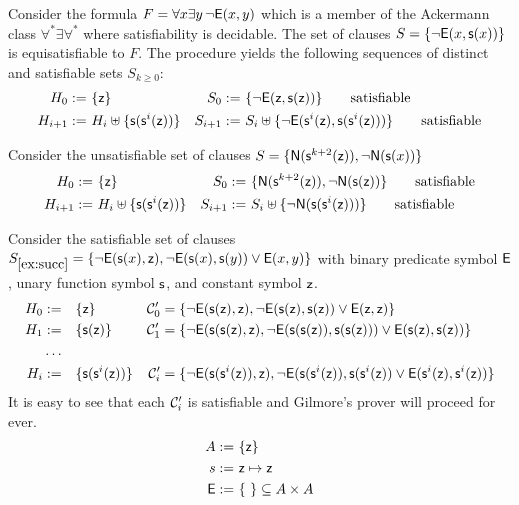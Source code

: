 \begin{example}
	Consider the formula 
	$F = \forall x\exists y\,\lnot{\mathsf{E}}(x,y)$
	which is a member of the Ackermann class $\forall^*\exists\forall^*$ 
	where satisfiability is decidable.
	The set of clauses 
	$S = \{ \lnot{\mathsf{E}}(x,{\mathsf s}(x)) \}$ is equisatisfiable to $F$.
	The procedure yields the following sequences of distinct and satisfiable sets $S_{k\geq0}$:
	\begin{align*}
	H_{0} :=&\  \{ {\mathsf z} \} 
	&
	S_{0} :=&\ \{ \lnot{\mathsf{E}}({\mathsf z},{\mathsf s}({\mathsf z}))
	\}
	\tag*{satisfiable}
	\\
	H_{i+1} :=&\ H_i \uplus \{ {\mathsf s}({\mathsf s}^{i}({\mathsf z})) \} 
	&
	S_{i+1} :=&\ S_i \uplus 
	\{
	\lnot{\mathsf{E}}({\mathsf s}^i({\mathsf z}),{\mathsf s}({\mathsf s}^i({\mathsf z})))
	\}
	\tag*{satisfiable}
	\end{align*}
\end{example}


\begin{example}\label{ex:simplesat}
	Consider the unsatisfiable set of clauses $S=\{ {\mathsf N}({\mathsf s}^{k+2}({\mathsf z})), \lnot{\mathsf N}({\mathsf s}(x))  \}$
	\begin{align*}
	H_{0} :=&\  \{ {\mathsf z} \} 
	&
	S_{0} :=&\ \{ {\mathsf N}({\mathsf s}^{k+2}({\mathsf z})), \lnot{\mathsf N}({\mathsf s}({\mathsf z}))
	\}
	\tag*{satisfiable}
	\\
	H_{i+1} :=&\ H_i \uplus \{ {\mathsf s}({\mathsf s}^{i}({\mathsf z})) \} 
	&
	S_{i+1} :=&\ S_i \uplus \{ \lnot{\mathsf N}({\mathsf s}({\mathsf s}^i({\mathsf z})))
	\}
	\tag*{satisfiable}
	\end{align*}
\end{example}

 

\begin{example}\label{ex:succ}
	Consider the satisfiable set of clauses 
	$S_{\ref{ex:succ}} = \{ 
	\lnot{\mathsf{E}}({\mathsf s}(x), {\mathsf z}), 
	\lnot {\mathsf{E}}({\mathsf s}(x), {\mathsf s}(y)) \lor {\mathsf{E}}(x,y)
	\}$ with binary predicate symbol ${\mathsf{E}}$, unary function symbol ${\mathsf s}$, and constant symbol ${\mathsf z}$.
	\begin{align*}
	H_0 :=&\quad \{ {\mathsf z} \} & {\mathcal C}_0' &= \{  
	\lnot{\mathsf{E}}({\mathsf s}({\mathsf z}), {\mathsf z}), 
	\lnot {\mathsf{E}}({\mathsf s}({\mathsf z}), {\mathsf s}({\mathsf z})) \lor {\mathsf{E}}({\mathsf z},{\mathsf z})
	\}
	\\
	H_1 :=&\quad \{ {\mathsf s}({\mathsf z}) \} & {\mathcal C}_1' &= \{ 
		\lnot{\mathsf{E}}({\mathsf s}({\mathsf s}({\mathsf z}), {\mathsf z}),
		\lnot {\mathsf{E}}({\mathsf s}({\mathsf s}({\mathsf z})), {\mathsf s}({\mathsf s}({\mathsf z}))) \lor {\mathsf{E}}({\mathsf s}({\mathsf z}),{\mathsf s}({\mathsf z}))
	 \}
	 \\\ldots
	 \\
	 H_i :=&\quad \{ 
	 {\mathsf s}({\mathsf s}^i({\mathsf z})) \} & {\mathcal C}_i' &= \{  
	 \lnot{\mathsf{E}}({\mathsf s}({\mathsf s}^i({\mathsf z})), {\mathsf z}), 
	 \lnot {\mathsf{E}}({\mathsf s}({\mathsf s}^i({\mathsf z})), {\mathsf s}({\mathsf s}^i({\mathsf z})) \lor {\mathsf{E}}({\mathsf s}^i({\mathsf z}),{\mathsf s}^i({\mathsf z}))
	 \}
	\end{align*} 
	It is easy to see that each ${\mathcal C}_i'$ is satisfiable and Gilmore's prover will proceed for ever.
	\begin{align*}
	A := &\ \{ {\mathsf z} \} \\
	s := &\ {\mathsf z}\mapsto{\mathsf z} \\
	{\mathsf{E}} := &\ \{\ \} \subseteq A\times A
	\end{align*}
\end{example}



